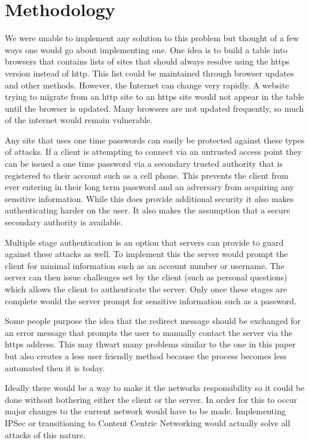 \documentclass{article}
\begin{document}
\section{Methodology}
We were unable to implement any solution to this problem but thought of a 
few ways one would go about implementing one.
One idea is to build a table into browsers that contains lists of sites that should always resolve using the https version instead of http.  This list could be maintained through browser updates and other methods.  However, the Internet can change very rapidly.  A website trying to migrate from an http site to an https site would not appear in the table until the browser is updated.  Many browsers are not updated frequently\cite{ie6countdown}, so much of the internet would remain vulnerable.

Any site that uses one time passwords can easily be protected against these types of attacks.  If a client is attempting to connect via an untrusted access point they can be issued a one time password via a secondary trusted authority that is registered to their account such as a cell phone.  This prevents the client from ever entering in their long term password and an adversary from acquiring any sensitive information.  While this does provide additional security it also makes authenticating harder on the user.  It also makes the assumption that a secure secondary authority is available.

Multiple stage authentication is an option that servers can provide to guard against these attacks as well.  To implement this the server would prompt the client for minimal information such as an account number or username.  The server can then issue challenges set by the client (such as personal questions) which allows the client to authenticate the server.  Only once these stages are complete would the server prompt for sensitive information such as a password.

Some people purpose the idea that the redirect message should be exchanged for an error message that prompts the user to manually contact the server via the https address.  This may thwart many problems similar to the one in this paper but also creates a less user friendly method because the process becomes less automated then it is today.

Ideally there would be a way to make it the networks responsibility so it could be done without bothering either the client or the server.  In order for this to occur major changes to the current network would have to be made.  Implementing IPSec or transitioning to Content Centric Networking would actually solve all attacks of this nature.
\end{document}
